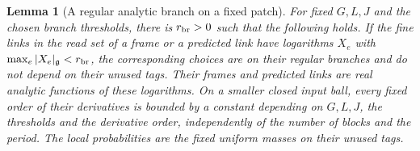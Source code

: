 \documentclass[11pt,reqno]{amsart}
\numberwithin{equation}{section}
\newtheorem{lemma}[theorem]{Lemma}
\theoremstyle{definition}
\theoremstyle{remark}
\newcommand{\g}{\mathfrak g}
\begin{document}
\begin{lemma}[A regular analytic branch on a fixed patch]
\label{lem:actual-analytic-branch}
For fixed \(G,L,J\) and the chosen branch thresholds, there is
\(r_{\rm br}>0\) such that the following holds. If the fine links
in the read set of a frame or a predicted link have logarithms
\(X_e\) with \(\max_e|X_e|_{\g}<r_{\rm br}\), the corresponding
choices are on their regular branches and do not depend on their
unused tags. Their frames and predicted links are real analytic
functions of these logarithms. On a smaller closed input ball,
every fixed order of their derivatives is bounded by a constant
depending on \(G,L,J\), the thresholds and the derivative order,
independently of the number of blocks and the period.
The local probabilities are the fixed uniform masses on their
unused tags.
\end{lemma}
\end{document}
